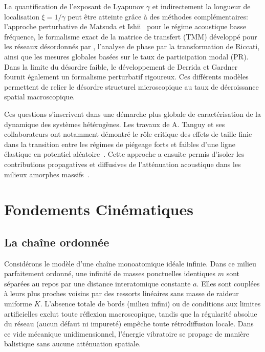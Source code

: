 La quantification de l'exposant de Lyapunov $\gamma$ et indirectement la longueur de localisation $\xi = 1/\gamma$ peut être atteinte grâce à des méthodes complémentaires: l'approche perturbative de Matsuda et Ishii~\cite{matsuda1970localization} pour le régime acoustique basse fréquence, le formalisme exact de la matrice de transfert (TMM) développé pour les réseaux désordonnés par \textcite{schmidt1957disordered}, l'analyse de phase par la transformation de Riccati, ainsi que les mesures globales basées sur le taux de participation modal (PR). Dans la limite du désordre faible, le développement de Derrida et Gardner~\cite{derrida1984lyapounov} fournit également un formalisme perturbatif rigoureux. Ces différents modèles permettent de relier le désordre structurel microscopique au taux de décroissance spatial macroscopique.

Ces questions s'inscrivent dans une démarche plus globale de caractérisation de la dynamique des systèmes hétérogènes. Les travaux de A. Tanguy et ses collaborateurs ont notamment démontré le rôle critique des effets de taille finie dans la transition entre les régimes de piégeage forts et faibles d'une ligne élastique en potentiel aléatoire~\cite{tanguy2004weak}. Cette approche a ensuite permis d'isoler les contributions propagatives et diffusives de l'atténuation acoustique dans les milieux amorphes massifs~\cite{beltukov2018propagative}.

\section{Fondements Cinématiques}

\subsection[La chaîne ordonnée]{La chaîne ordonnée}
Considérons le modèle d'une chaîne monoatomique idéale infinie. Dans ce milieu parfaitement ordonné, une infinité de masses ponctuelles identiques $m$ sont séparées au repos par une distance interatomique constante $a$. Elles sont couplées à leurs plus proches voisins par des ressorts linéaires sans masse de raideur uniforme $K$. L'absence totale de bords (milieu infini) ou de conditions aux limites artificielles exclut toute réflexion macroscopique, tandis que la régularité absolue du réseau (aucun défaut ni impureté) empêche toute rétrodiffusion locale. Dans ce vide mécanique unidimensionnel, l'énergie vibratoire se propage de manière balistique sans aucune atténuation spatiale.

